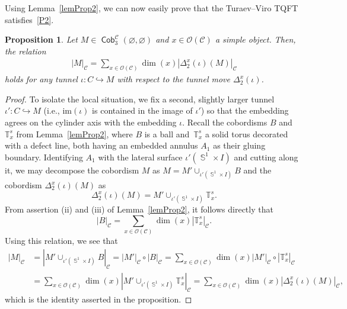 \documentclass[10pt,a4paper]{amsart}
\DeclareMathOperator{\Sp}{\mathbb{S}}
\DeclareMathOperator{\Cob}{\mathsf{Cob}}
\numberwithin{equation}{section}
\newtheorem{Proposition}[Proposition]{Proposition}
\theoremstyle{definition}
\begin{document}
Using Lemma~\ref{lemProp2}, we can now easily prove that the Turaev--Viro TQFT satisfies~\ref{P2}.
\begin{Proposition}
 \label{propProp2}
 Let $M \in \Cob_3^{\mathcal{C}}(\varnothing, \varnothing)$ and $x \in \mathcal{O}(\mathcal{C})$ a simple object. Then, the relation
 \begin{align*}
 |M|_{\mathcal{C}} = \sum_{x \in \mathcal{O}(\mathcal{C})}\dim(x)|\Delta_2^x(\iota)(M)|_{\mathcal{C}}
 \end{align*}
 holds for any tunnel $\iota\colon C \hookrightarrow M$ with respect to the tunnel move $\Delta_2^x(\iota)$.
\end{Proposition}
\begin{proof}
To isolate the local situation, we fix a second, slightly larger tunnel $\iota'\colon C \hookrightarrow M$ (i.e., $\mathrm{im}(\iota)$ is contained in the image of $\iota'$) so that the embedding agrees on the cylinder axis with the embedding $\iota$. Recall the cobordisms $B$ and $\mathbb{T}_x^s$ from Lemma~\ref{lemProp2}, where $B$ is a ball and~$\mathbb{T}_x^s$ a solid torus decorated with a defect line, both having an embedded annulus $A_1$ as their gluing boundary. Identifying $A_1$ with the lateral surface $\iota'(\Sp^1 \times I)$ and cutting along it, we may decompose the cobordism $M$ as $M = M' \cup_{\iota'(\Sp^1 \times I)}B$ and the cobordism $\Delta_2^x(\iota)(M)$ as
\[
\Delta_2^x(\iota)(M) = M' \cup_{\iota' (\Sp^1 \times I )} \mathbb{T}_x^s.
\] From assertion (ii) and (iii) of Lemma~\ref{lemProp2}, it follows directly that
\[
|B|_{\mathcal{C}} = \sum_{x \in \mathcal{O}(\mathcal{C})}\dim(x) |\mathbb{T}_x^s|_{\mathcal{C}}.
\] Using this relation, we see that
\begin{align*}
 |M|_{\mathcal{C}} &= |M' \cup_{\iota'(\Sp^1 \times I)}B|_{\mathcal{C}} = |M'|_{\mathcal{C}} \circ |B|_{\mathcal{C}} = \sum_{x \in \mathcal{O}(\mathcal{C})}\dim(x)|M'|_{\mathcal{C}} \circ |\mathbb{T}_x^s|_{\mathcal{C}} \\
 &= \sum_{x \in \mathcal{O}(\mathcal{C})}\dim(x)|M'\cup_{\iota'(\Sp^1 \times I)}\mathbb{T}_x^s|_{\mathcal{C}} = \sum_{x \in \mathcal{O}(\mathcal{C})}\dim(x) |\Delta_2^x(\iota)(M)|_{\mathcal{C}},
\end{align*}
which is the identity asserted in the proposition.
\end{proof}
\end{document}
